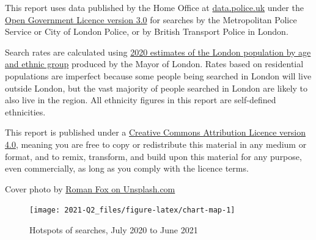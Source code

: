 \documentclass[
  a4paper,
  twoside, 11pt]{article}
\begin{document}
This report uses data published by the Home Office at \href{https://data.police.uk/}{data.police.uk} under the \href{https://www.nationalarchives.gov.uk/doc/open-government-licence/version/3/}{Open Government Licence version 3.0} for searches by the Metropolitan Police Service or City of London Police, or by British Transport Police in London.

Search rates are calculated using \href{https://data.london.gov.uk/dataset/ethnic-group-population-projections}{2020 estimates of the London population by age and ethnic group} produced by the Mayor of London. Rates based on residential populations are imperfect because some people being searched in London will live outside London, but the vast majority of people searched in London are likely to also live in the region. All ethnicity figures in this report are self-defined ethnicities.

This report is published under a \href{https://creativecommons.org/licenses/by/4.0/}{Creative Commons Attribution Licence version 4.0}, meaning you are free to copy or redistribute this material in any medium or format, and to remix, transform, and build upon this material for any purpose, even commercially, as long as you comply with the licence terms.

Cover photo by \href{https://unsplash.com/photos/nwt4QL2D_6o}{Roman Fox on Unsplash.com}




\begin{figure}[tb]

{\centering \texttt{[image: 2021-Q2\_files/figure-latex/chart-map-1]} 

}

\caption{Hotspots of searches, July 2020 to June 2021}\label{fig:chart-map}
\end{figure}
\end{document}
